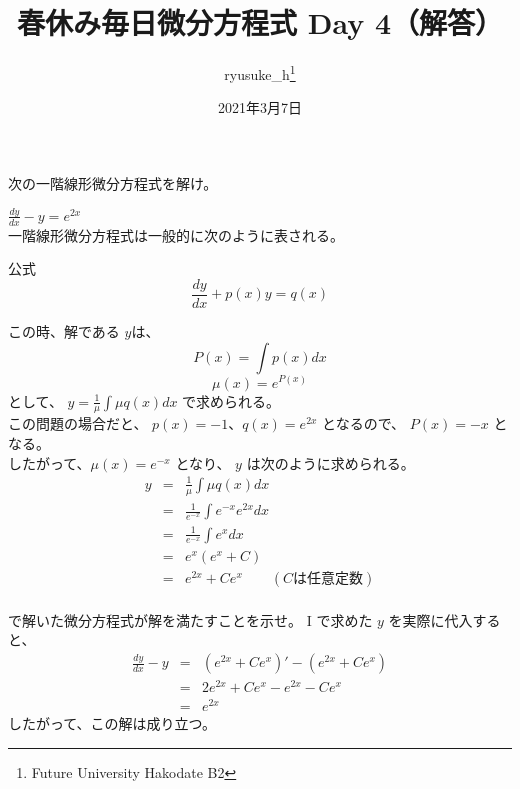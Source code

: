 \documentclass[a4j]{jsarticle}
\title{春休み毎日微分方程式 Day 4（解答）}
\author{ryusuke\_h\thanks{Future University Hakodate B2}}
\date{2021年3月7日}
\begin{document}
\begin{spacing}{1.6}
\maketitle

次の一階線形微分方程式を解け。
\begin{qparts}
    \qpart $ \displaystyle \frac{dy}{dx} - y = e ^ {2x} $ \\
    一階線形微分方程式は一般的に次のように表される。\\
    \begin{itembox}{公式}
       \begin{equation}
         \frac{dy}{dx} + p(x)y = q(x) \nonumber
       \end{equation}
    \end{itembox}
     この時、解である $ y $は、\\
     \begin{equation}
       P(x) = \int p(x) dx \nonumber
     \end{equation}
     \begin{equation}
       \mu (x) = e ^ {P(x)} \nonumber
     \end{equation}
     として、 $ \displaystyle y = \frac{1}{\mu} \int \mu q(x) dx $ で求められる。\\
     この問題の場合だと、 $ p(x) =-1 $、$q(x) = e ^ {2x} $ となるので、 $ P(x) = - x $ となる。 \\
     したがって、$ \mu (x) = e ^ {-x} $ となり、 $ y $ は次のように求められる。\\
     \begin{eqnarray*}
       y & = & \frac{1}{\mu} \int \mu q(x) dx \\
       & = & \frac{1}{e ^ {-x}} \int e ^ {-x} e ^ {2x} dx \\
       & = & \frac{1}{e ^ {-x}} \int e ^ x dx \\
       & = & e ^ x (e ^ x + C) \\
       & = & e ^ {2x} + Ce ^ x \qquad (Cは任意定数) \\
     \end{eqnarray*}

      で解いた微分方程式が解を満たすことを示せ。
     {\rm I} で求めた $ y $ を実際に代入すると、 \\
     \begin{eqnarray*}
       \frac{dy}{dx} - y & = & {(e ^ {2x} + Ce ^ x)\prime} - (e ^ {2x} + Ce ^ x) \\
       & = & 2 e ^ {2x} + Ce ^ x - e ^ {2x} - Ce ^ x \\
       & = & e ^ {2x}
     \end{eqnarray*}
     したがって、この解は成り立つ。
\end{qparts}

\end{spacing}
\end{document}
